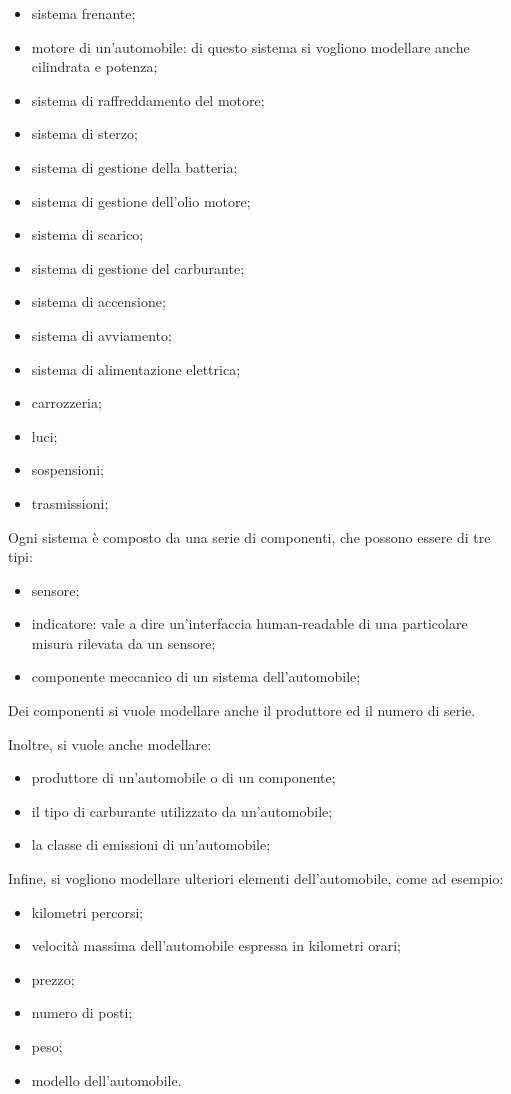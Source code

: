 \begin{itemize}
    \item sistema frenante;
    \item motore di un'automobile: di questo sistema si vogliono modellare anche cilindrata e potenza;
    \item sistema di raffreddamento del motore;
    \item sistema di sterzo;
    \item sistema di gestione della batteria;
    \item sistema di gestione dell'olio motore;
    \item sistema di scarico;
    \item sistema di gestione del carburante;
    \item sistema di accensione;
    \item sistema di avviamento;
    \item sistema di alimentazione elettrica;
    \item carrozzeria;
    \item luci;
    \item sospensioni;
    \item trasmissioni;
\end{itemize}

Ogni sistema è composto da una serie di componenti, che possono essere di tre tipi:
\begin{itemize}
    \item sensore;
    \item indicatore: vale a dire un'interfaccia human-readable di una particolare misura rilevata da un sensore;
    \item componente meccanico di un sistema dell'automobile;
\end{itemize}

Dei componenti si vuole modellare anche il produttore ed il numero di serie.

Inoltre, si vuole anche modellare:

\begin{itemize}
    \item produttore di un'automobile o di un componente;
    \item il tipo di carburante utilizzato da un'automobile;
    \item la classe di emissioni di un'automobile;
\end{itemize}

Infine, si vogliono modellare ulteriori elementi dell'automobile, come ad esempio:

\begin{itemize}
    \item kilometri percorsi;
    \item velocità massima dell'automobile espressa in kilometri orari;
    \item prezzo;
    \item numero di posti;
    \item peso;
    \item modello dell'automobile.
\end{itemize}